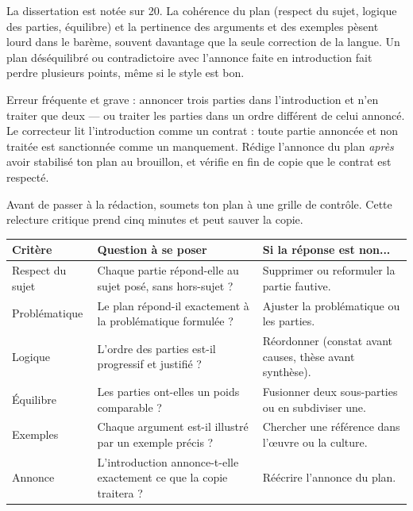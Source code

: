 \documentclass[11pt]{article}
\newcommand{\cle}[1]{{\popxbold\color{popdark}#1}}
\newcounter{popsec}
\newcounter{popsub}
\newcommand{\courssub}[1]{%
  \stepcounter{popsub}%
  \par\vspace{9pt}\noindent{\popxbold\fontsize{11.5}{13}\selectfont\color{popink}{\color{poporange}\thepopsec.\thepopsub}\hspace{6pt}#1}\par\nopagebreak\vspace{4pt}
}
\begin{document}
\begin{exemplebox}
La dissertation est notée sur 20. La \cle{cohérence du plan} (respect du sujet, logique des parties, équilibre) et la \cle{pertinence des arguments et des exemples} pèsent lourd dans le barème, souvent davantage que la seule correction de la langue. Un plan déséquilibré ou contradictoire avec l'annonce faite en introduction fait perdre plusieurs points, même si le style est bon.
\end{exemplebox}

\begin{attention}
Erreur fréquente et grave : annoncer trois parties dans l'introduction et n'en traiter que deux — ou traiter les parties dans un ordre différent de celui annoncé. Le correcteur lit l'introduction comme un contrat : toute partie annoncée et non traitée est sanctionnée comme un manquement. Rédige l'annonce du plan \emph{après} avoir stabilisé ton plan au brouillon, et vérifie en fin de copie que le contrat est respecté.
\end{attention}

\courssub{Auto-évaluation du plan détaillé}

Avant de passer à la rédaction, soumets ton plan à une grille de contrôle. Cette relecture critique prend cinq minutes et peut sauver la copie.

\begin{center}
\begin{tabularx}{\linewidth}{|l|X|X|}
\hline
\rowcolor{popblueL} \textbf{Critère} & \textbf{Question à se poser} & \textbf{Si la réponse est non...} \\
\hline
Respect du sujet & Chaque partie répond-elle au sujet posé, sans hors-sujet ? & Supprimer ou reformuler la partie fautive. \\
\hline
Problématique & Le plan répond-il exactement à la problématique formulée ? & Ajuster la problématique ou les parties. \\
\hline
Logique & L'ordre des parties est-il progressif et justifié ? & Réordonner (constat avant causes, thèse avant synthèse). \\
\hline
Équilibre & Les parties ont-elles un poids comparable ? & Fusionner deux sous-parties ou en subdiviser une. \\
\hline
Exemples & Chaque argument est-il illustré par un exemple précis ? & Chercher une référence dans l'œuvre ou la culture. \\
\hline
Annonce & L'introduction annonce-t-elle exactement ce que la copie traitera ? & Réécrire l'annonce du plan. \\
\hline
\end{tabularx}
\end{center}
\end{document}
